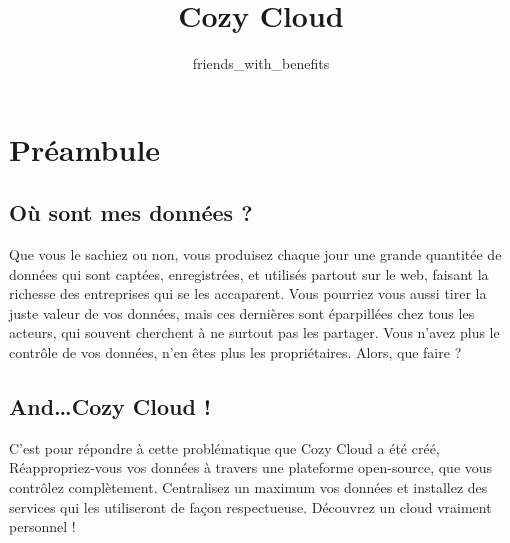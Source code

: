 \documentclass{42-fr}
\begin{document}
                           \title{Cozy Cloud}
                          \subtitle{friends\_with\_benefits}


\maketitle

\tableofcontents


\chapter{Préambule}


	\section{O\`u sont mes donn\'ees ?}

		Que vous le sachiez ou non, vous produisez chaque jour une grande quantit\'ee de donn\'ees
		qui sont capt\'ees, enregistr\'ees, et utilis\'es partout sur le web, faisant
		la richesse des entreprises qui se les accaparent. Vous pourriez vous aussi
		tirer la juste valeur de vos donn\'ees, mais ces dernières sont \'eparpill\'ees
		chez tous les acteurs, qui souvent cherchent \`a ne surtout pas les partager.
		Vous n'avez plus le contrôle de vos donn\'ees, n'en \^etes plus les propri\'etaires.
		Alors, que faire ?


	\section{And…Cozy Cloud !}

		C'est pour r\'epondre \`a cette probl\'ematique que Cozy Cloud a \'et\'e  cr\'e\'e,
		R\'eappropriez-vous vos donn\'ees à travers une plateforme open-source, que vous contr\^olez
		compl\`etement. Centralisez un maximum vos donn\'ees et installez des services
		qui les utiliseront de façon respectueuse. D\'ecouvrez un cloud vraiment personnel !
\end{document}
